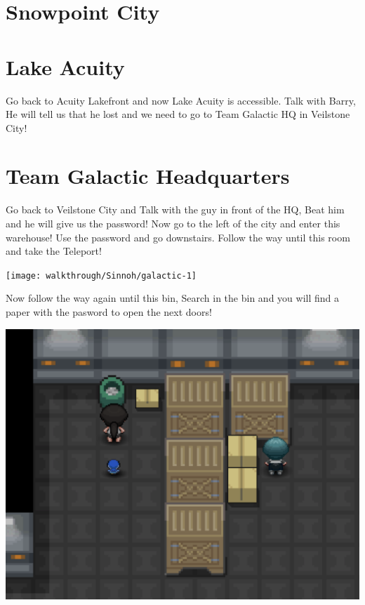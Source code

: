 \documentclass[11pt]{article}
\begin{document}


\section{Snowpoint City}\label{sec:snowpoint-city}

\section{Lake Acuity}\label{sec:lake-acuity}
Go back to Acuity Lakefront and now Lake Acuity is accessible.
Talk with Barry, He will tell us that
he lost and we need to go to Team Galactic HQ in Veilstone City!

\section{Team Galactic Headquarters}\label{sec:team-galactic-headquarters}
Go back to Veilstone City and Talk with the guy in front of the HQ,
Beat him and he will give us the password!
Now go to the left of the city and enter this warehouse!
Use the password and go downstairs.
Follow the way until this room and take the Teleport!

\texttt{[image: walkthrough/Sinnoh/galactic-1]}

Now follow the way again until this bin, Search in the bin and you will
find a paper with the pasword to open the next doors!

\includegraphics[width=\textwidth]{walkthrough/Sinnoh/galactic-2}
\end{document}
